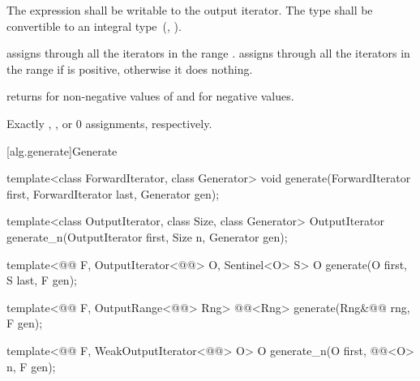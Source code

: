 \begin{itemdescr}
\begin{removedblock}
\pnum
\requires
The expression
shall be writable to the output iterator. The type
shall be convertible to an integral type~(, ).
\end{removedblock}

\pnum
\effects
{} assigns  through all the
iterators in the range . 
assigns  through all the iterators in the range 
if  is positive, otherwise it does nothing.

\pnum
\returns {} returns 
for non-negative values of  and  for negative values.

\pnum
\complexity
Exactly
,
, or 0 assignments, respectively.
\end{itemdescr}

[alg.generate]{Generate}

%
%
\begin{removedblock}
\begin{itemdecl}
template<class ForwardIterator, class Generator>
  void generate(ForwardIterator first, ForwardIterator last,
                Generator gen);

template<class OutputIterator, class Size, class Generator>
  OutputIterator generate_n(OutputIterator first, Size n, Generator gen);
\end{itemdecl}
\end{removedblock}
\begin{addedblock}
\begin{itemdecl}
template<@@ F, OutputIterator<@@> O,
    Sentinel<O> S>
  O generate(O first, S last, F gen);

template<@@ F, OutputRange<@@> Rng>
  @@<Rng>
    generate(Rng&@\newtxt{\&}@ rng, F gen);

template<@@ F, WeakOutputIterator<@@> O>
  O generate_n(O first, @@<O> n, F gen);
\end{itemdecl}
\end{addedblock}

